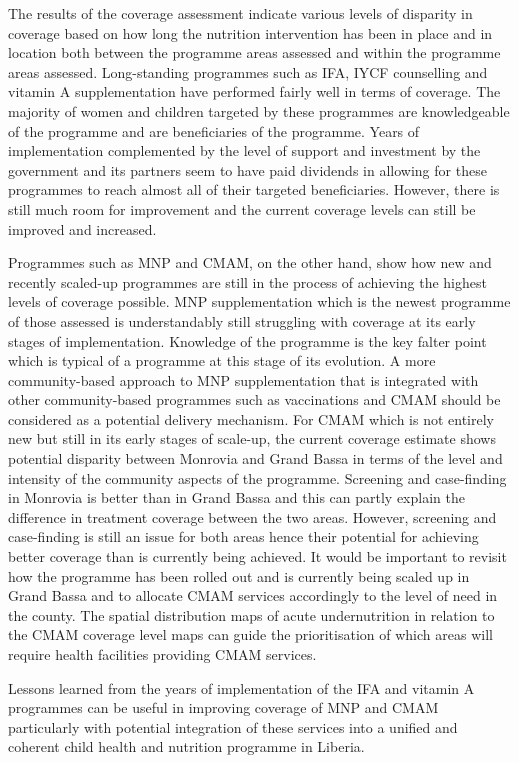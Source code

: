 \documentclass[12pt,a4paper]{article}
\begin{document}
The results of the coverage assessment indicate various levels of disparity in coverage based on how long the nutrition intervention has been in place and in location both between the programme areas assessed and within the programme areas assessed. Long-standing programmes such as IFA, IYCF counselling and vitamin A supplementation have performed fairly well in terms of coverage. The majority of women and children targeted by these programmes are knowledgeable of the programme and are beneficiaries of the programme. Years of implementation complemented by the level of support and investment by the government and its partners seem to have paid dividends in allowing for these programmes to reach almost all of their targeted beneficiaries. However, there is still much room for improvement and the current coverage levels can still be improved and increased.

Programmes such as MNP and CMAM, on the other hand, show how new and recently scaled-up programmes are still in the process of achieving the highest levels of coverage possible. MNP supplementation which is the newest programme of those assessed is understandably still struggling with coverage at its early stages of implementation. Knowledge of the programme is the key falter point which is typical of a programme at this stage of its evolution. A more community-based approach to MNP supplementation that is integrated with other community-based programmes such as vaccinations and CMAM should be considered as a potential delivery mechanism. For CMAM which is not entirely new but still in its early stages of scale-up, the current coverage estimate shows potential disparity between Monrovia and Grand Bassa in terms of the level and intensity of the community aspects of the programme. Screening and case-finding in Monrovia is better than in Grand Bassa and this can partly explain the difference in treatment coverage between the two areas. However, screening and case-finding is still an issue for both areas hence their potential for achieving better coverage than is currently being achieved. It would be important to revisit how the programme has been rolled out and is currently being scaled up in Grand Bassa and to allocate CMAM services accordingly to the level of need in the county. The spatial distribution maps of acute undernutrition in relation to the CMAM coverage level maps can guide the prioritisation of which areas will require health facilities providing CMAM services.

Lessons learned from the years of implementation of the IFA and vitamin A programmes can be useful in improving coverage of MNP and CMAM particularly with potential integration of these services into a unified and coherent child health and nutrition programme in Liberia.
\end{document}
